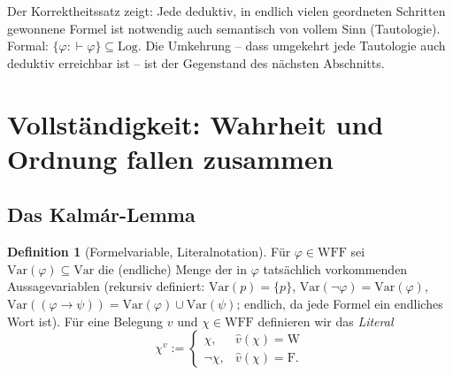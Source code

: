 \documentclass[12pt, a4paper]{article}
\theoremstyle{definition}
\newtheorem{definition}[theorem]{Definition}
\theoremstyle{remark}
\newcommand{\W}{\mathrm{W}}
\newcommand{\F}{\mathrm{F}}
\newcommand{\WFF}{\mathrm{WFF}}
\newcommand{\Var}{\mathrm{Var}}
\newcommand{\Log}{\mathrm{Log}}
\begin{document}
Der Korrektheitssatz zeigt: Jede deduktiv, in endlich vielen geordneten Schritten gewonnene Formel ist notwendig auch semantisch von vollem Sinn (Tautologie). Formal: $\{\varphi : \vdash\varphi\} \subseteq \Log$. Die Umkehrung -- dass umgekehrt jede Tautologie auch deduktiv erreichbar ist -- ist der Gegenstand des nächsten Abschnitts.

\section{Vollständigkeit: Wahrheit und Ordnung fallen zusammen}
\label{sec:vollstaendigkeit}

\subsection{Das Kalmár-Lemma}
\label{subsec:kalmar}

\begin{definition}[Formelvariable, Literalnotation]
\label{def:literalnotation}
Für $\varphi \in \WFF$ sei $\Var(\varphi) \subseteq \Var$ die (endliche) Menge der in $\varphi$ tatsächlich vorkommenden Aussagevariablen (rekursiv definiert: $\Var(p)=\{p\}$, $\Var(\neg\varphi)=\Var(\varphi)$, $\Var((\varphi\to\psi))=\Var(\varphi)\cup\Var(\psi)$; endlich, da jede Formel ein endliches Wort ist). Für eine Belegung $v$ und $\chi \in \WFF$ definieren wir das \emph{Literal}
\[
  \chi^v := \begin{cases} \chi, & \hat v(\chi) = \W \\ \neg\chi, & \hat v(\chi) = \F. \end{cases}
\]
\end{definition}
\end{document}
